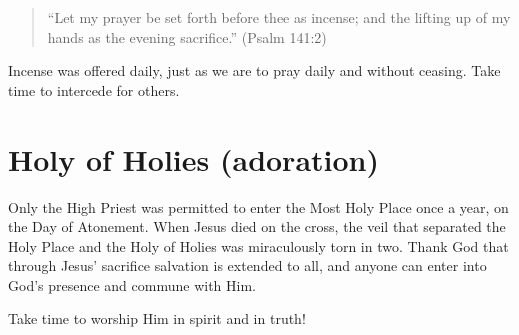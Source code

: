 \begin{quote}
``Let my prayer be set forth before thee as incense;
    and the lifting up of my hands as the evening sacrifice.'' (Psalm 141:2)
\end{quote}

Incense was offered daily, just as we are to pray daily and without ceasing.
Take time to intercede for others.


\section{Holy of Holies (adoration)}

Only the High Priest was permitted to enter the Most Holy Place
once a year, on the Day of Atonement.
When Jesus died on the cross, the veil that separated the Holy Place
and the Holy of Holies was miraculously torn in two.
Thank God that through Jesus' sacrifice salvation is extended to all,
and anyone can enter into God’s presence and commune with Him.

Take time to worship Him in spirit and in truth!
